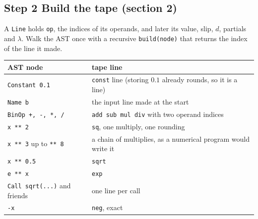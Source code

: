 \documentclass[11pt]{article}
\newcommand{\lam}{\lambda}
\begin{document}
\subsection*{Step 2 \quad Build the tape (section 2)}
A \texttt{Line} holds \texttt{op}, the indices of its operands, and later its value, slip, $d$, partials and $\lam$. Walk the AST once with a recursive \texttt{build(node)} that returns the index of the line it made.
\begin{center}
\begin{tabular}{@{}ll@{}}
\toprule
AST node & tape line \\
\midrule
\texttt{Constant 0.1} & \texttt{const} line (storing $0.1$ already rounds, so it is a line) \\
\texttt{Name b} & the input line made at the start \\
\texttt{BinOp +, -, *, /} & \texttt{add sub mul div} with two operand indices \\
\texttt{x ** 2} & \texttt{sq}, one multiply, one rounding \\
\texttt{x ** 3} up to \texttt{** 8} & a chain of multiplies, as a numerical program would write it \\
\texttt{x ** 0.5} & \texttt{sqrt} \\
\texttt{e ** x} & \texttt{exp} \\
\texttt{Call sqrt(...)} and friends & one line per call \\
\texttt{-x} & \texttt{neg}, exact \\
\bottomrule
\end{tabular}
\end{center}
\end{document}
